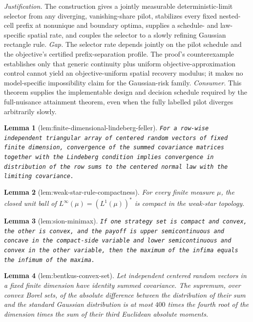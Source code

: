 \documentclass{article}
\newtheorem{lemma}{Lemma}
\begin{document}
\par\smallskip\noindent \textit{Justification.} The construction gives a jointly measurable deterministic-limit selector from any diverging, vanishing-share pilot, stabilizes every fixed nested-cell prefix at nonunique and boundary optima, supplies a schedule- and law-specific spatial rate, and couples the selector to a slowly refining Gaussian rectangle rule. \textit{Gap.} The selector rate depends jointly on the pilot schedule and the objective's certified prefix-separation profile. The proof's counterexample establishes only that generic continuity plus uniform objective-approximation control cannot yield an objective-uniform spatial recovery modulus; it makes no model-specific impossibility claim for the Gaussian-risk family. \textit{Consumer.} This theorem supplies the implementable design and decision schedule required by the full-nuisance attainment theorem, even when the fully labelled pilot diverges arbitrarily slowly.

\begin{lemma}[lem:finite-dimensional-lindeberg-feller]\label{lem:finite-dimensional-lindeberg-feller}
\texttt{For a row-\allowbreak{}wise independent triangular array of centered random vectors of fixed finite dimension,\allowbreak{} convergence of the summed covariance matrices together with the Lindeberg condition implies convergence in distribution of the row sums to the centered normal law with the limiting covariance.}
\end{lemma}

\begin{lemma}[lem:weak-star-rule-compactness]\label{lem:weak-star-rule-compactness}
For every finite measure \(\mu\), the closed unit ball of \(L^\infty(\mu)=(L^1(\mu))^*\) is compact in the weak-star topology.
\end{lemma}

\begin{lemma}[lem:sion-minimax]\label{lem:sion-minimax}
\texttt{If one strategy set is compact and convex,\allowbreak{} the other is convex,\allowbreak{} and the payoff is upper semicontinuous and concave in the compact-\allowbreak{}side variable and lower semicontinuous and convex in the other variable,\allowbreak{} then the maximum of the infima equals the infimum of the maxima.}
\end{lemma}

\begin{lemma}[lem:bentkus-convex-set]\label{lem:bentkus-convex-set}
Let independent centered random vectors in a fixed finite dimension have identity summed covariance. The supremum, over convex Borel sets, of the absolute difference between the distribution of their sum and the standard Gaussian distribution is at most \(400\) times the fourth root of the dimension times the sum of their third Euclidean absolute moments.
\end{lemma}
\end{document}
